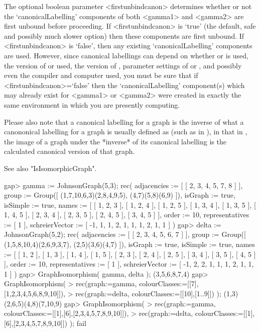The optional boolean parameter <firstunbindcanon> determines whether or
not the `canonicalLabelling' components of both <gamma1> and <gamma2>
are first unbound before proceeding.  If <firstunbindcanon> is `true'
(the default, safe and possibly much slower option) then these components
are first unbound.  If <firstunbindcanon> is `false', then any existing
`canonicalLabelling' components are used.  However, since canonical
labellings can depend on whether {\nauty} or {\bliss} is used, the version
of {\nauty} or {\bliss} used, the version of {\GRAPE}, parameter settings
of {\nauty} or {\bliss}, and possibly even the compiler and computer
used, you must be sure that if <firstunbindcanon>=`false' then the
`canonicalLabelling' component(s) which may already exist for <gamma1>
or <gamma2> were created in exactly the same environment in which you
are presently computing.

Please also note that a canonical labelling for a {\GRAPE} graph is the
inverse of what a canononical labelling for a graph is usually defined as
(such as in {\bliss}), in that in {\GRAPE}, the image of a graph under
the *inverse* of its canonical labelling is the calculated canonical
version of that graph.

See also "IsIsomorphicGraph".

\beginexample
gap> gamma := JohnsonGraph(5,3);
rec( adjacencies := [ [ 2, 3, 4, 5, 7, 8 ] ], 
  group := Group([ (1,7,10,6,3)(2,8,4,9,5), (4,7)(5,8)(6,9) ]), 
  isGraph := true, isSimple := true, 
  names := [ [ 1, 2, 3 ], [ 1, 2, 4 ], [ 1, 2, 5 ], [ 1, 3, 4 ], [ 1, 3, 5 ], 
      [ 1, 4, 5 ], [ 2, 3, 4 ], [ 2, 3, 5 ], [ 2, 4, 5 ], [ 3, 4, 5 ] ], 
  order := 10, representatives := [ 1 ], 
  schreierVector := [ -1, 1, 1, 2, 1, 1, 1, 2, 1, 1 ] )
gap> delta := JohnsonGraph(5,2);
rec( adjacencies := [ [ 2, 3, 4, 5, 6, 7 ] ], 
  group := Group([ (1,5,8,10,4)(2,6,9,3,7), (2,5)(3,6)(4,7) ]), 
  isGraph := true, isSimple := true, 
  names := [ [ 1, 2 ], [ 1, 3 ], [ 1, 4 ], [ 1, 5 ], [ 2, 3 ], [ 2, 4 ], 
      [ 2, 5 ], [ 3, 4 ], [ 3, 5 ], [ 4, 5 ] ], order := 10, 
  representatives := [ 1 ], schreierVector := [ -1, 2, 2, 1, 1, 1, 2, 1, 1, 1 
     ] )
gap> GraphIsomorphism( gamma, delta );
(3,5,6,8,7,4)
gap> GraphIsomorphism( 
>       rec(graph:=gamma, colourClasses:=[[7],[1,2,3,4,5,6,8,9,10]]), 
>       rec(graph:=delta, colourClasses:=[[10],[1..9]]) ); 
(1,3)(2,6,5)(4,8)(7,10,9)
gap> GraphIsomorphism( 
>       rec(graph:=gamma, colourClasses:=[[1],[6],[2,3,4,5,7,8,9,10]]), 
>       rec(graph:=delta, colourClasses:=[[1],[6],[2,3,4,5,7,8,9,10]]) ); 
fail
\endexample

